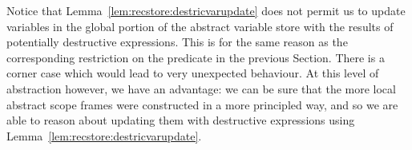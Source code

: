 \documentclass{article}
\begin{document}
Notice that Lemma~\ref{lem:recstore:destricvarupdate} does not permit us to
update variables in the global portion of the abstract variable store with the
results of potentially destructive expressions. This is for the same reason as
the corresponding restriction on the \store predicate in
the previous Section. There is a corner case which would
lead to very unexpected behaviour. At this level of abstraction however, we
have an advantage: we can be sure that the more local abstract scope frames
were constructed in a more principled way, and so we are able to reason about
updating them with destructive expressions using
Lemma~\ref{lem:recstore:destricvarupdate}.
\end{document}
